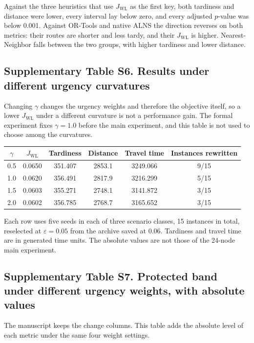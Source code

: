 \documentclass[11pt,a4paper]{article}
\begin{document}
Against the three heuristics that use $J_{\mathrm{WL}}$ as the first key, both tardiness and distance were lower, every interval lay below zero, and every adjusted $p$-value was below 0.001. Against OR-Tools and native ALNS the direction reverses on both metrics: their routes are shorter and less tardy, and their $J_{\mathrm{WL}}$ is higher. Nearest-Neighbor falls between the two groups, with higher tardiness and lower distance.

\subsection*{Supplementary Table S6. Results under different urgency curvatures}

Changing $\gamma$ changes the urgency weights and therefore the objective itself, so a lower $J_{\mathrm{WL}}$ under a different curvature is not a performance gain. The formal experiment fixes $\gamma=1.0$ before the main experiment, and this table is not used to choose among the curvatures.

\begin{center}
\small
\begin{tabular}{cccccc}
\toprule
$\gamma$ & $J_{\mathrm{WL}}$ & Tardiness & Distance & Travel time & Instances rewritten \\
\midrule
0.5 & 0.0650 & 351.407 & 2853.1 & 3249.066 & 9/15 \\
1.0 & 0.0620 & 356.491 & 2817.9 & 3216.299 & 5/15 \\
1.5 & 0.0603 & 355.271 & 2748.1 & 3141.872 & 3/15 \\
2.0 & 0.0602 & 356.785 & 2768.7 & 3165.652 & 3/15 \\
\bottomrule
\end{tabular}
\end{center}

Each row uses five seeds in each of three scenario classes, 15 instances in total, reselected at $\varepsilon=0.05$ from the archive saved at 0.06. Tardiness and travel time are in generated time units. The absolute values are not those of the 24-node main experiment.

\subsection*{Supplementary Table S7. Protected band under different urgency weights, with absolute values}

The manuscript keeps the change columns. This table adds the absolute level of each metric under the same four weight settings.
\end{document}
